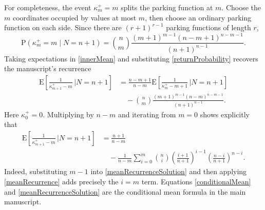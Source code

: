 \documentclass[11pt]{article}
\newcommand{\E}[1]{\mathrm{E}\left[#1\right]}
\newcommand{\PP}[1]{\mathrm{P}\left(#1\right)}
\begin{document}
For completeness, the event $\kappa_m^+=m$ splits the parking function
at $m$. Choose the $m$ coordinates occupied by values at most $m$,
then choose an ordinary parking function on each side. Since there are
$(r+1)^{r-1}$ parking functions of length $r$,
\begin{equation}\label{returnProbability}
\PP{\kappa_m^+=m\mid N=n+1}
=\binom nm\frac{(m+1)^{m-1}(n-m+1)^{n-m-1}}
{(n+1)^{n-1}}.
\end{equation}
Taking expectations in \eqref{innerMean} and substituting
\eqref{returnProbability} recovers the manuscript's recurrence
\begin{align}\label{meanRecurrence}
\E{\frac1{\kappa_{m+1}^+-m}\,\bigg|N=n+1}
&=\frac{n-m+1}{n-m}
\E{\frac1{\kappa_m^+-m+1}\,\bigg|N=n+1}\nonumber\\[-2pt]
&\quad-
\binom nm\frac{(m+1)^{m-1}(n-m)^{n-m-1}}
{(n+1)^{n-1}}.
\end{align}
Here $\kappa_0^+=0$. Multiplying by $n-m$ and iterating from $m=0$
shows explicitly that
\begin{align}\label{meanRecurrenceSolution}
\E{\frac1{\kappa_{m+1}^+-m}\,\bigg|N=n+1}
&=\frac{n+1}{n-m}\nonumber\\[-2pt]
&\quad-\frac1{n-m}\sum_{i=0}^m\binom ni
\left(\frac{i+1}{n+1}\right)^{i-1}
\left(\frac{n-i}{n+1}\right)^{n-i}.
\end{align}
Indeed, substituting $m-1$ into \eqref{meanRecurrenceSolution} and
then applying \eqref{meanRecurrence} adds precisely the $i=m$ term.
Equations \eqref{conditionalMean} and \eqref{meanRecurrenceSolution}
are the conditional mean formula in the main manuscript.
\end{document}

